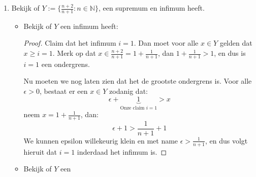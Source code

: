 \documentclass{article}
\newcommand{\f}[2]{\frac{#1}{#2}}
\newcommand{\tx}[1]{\text{#1}}
\newcommand{\N}{\mathbb{N}}
\begin{document}
\begin{enumerate}[label=\arabic*]
\begin{enumerate}[label=\alph*)]
\begin{enumerate}
\begin{itemize}
\begin{proof}
                                            Nu moeten we nog laten zien dat $s = 1$ de kleinste bovengrens is.
                                            Neem $x = 1 - \f{1}{n+2}$, dan moet gelden $\forall epsilon > 0$ dat:
                                            \[1 - \epsilon < x\]
                                            Waarbij $1$ de gesuggereerde bovengrens $s$ is.
                                            substitueer $x = 1 - \f{1}{n+2}$:
                                            \[1 - \epsilon < 1- \f{1}{n+2}\]
                                            Neem aan dat $\epsilon > \f{1}{n+2}$ dan is er altijd een
                                            $x$ waarvoor epsilon groter is als we $n$ groot genoeg maken.
                                            Hieruit volgt dus dat $s = 1$ de kleinste bovengrens moet zijn.
                                        \end{proof}
                              \end{itemize}
                        \item Bekijk of $Y:= \{\f{n+2}{n+1}: n \in \N\}$, een supremum en infimum heeft.
                              \begin{itemize}
                                  \item Bekijk of $Y$ een infimum heeft:
                                        \begin{proof}
                                            Claim dat het infimum $i = 1$.
                                            Dan moet voor alle $x \in Y$ gelden dat $x \geq i = 1$.
                                            Merk op dat $x \in \f{n+2}{n+1} = 1 + \f{1}{n+1}$, dan
                                            $1 + \f{1}{n+1} > 1$, en dus is $i=1$ een ondergrens.

                                            Nu moeten we nog laten zien dat het de grootste ondergrens is.
                                            Voor alle $\epsilon > 0$, bestaat er een $x \in Y$ zodanig dat:
                                            \[\epsilon + \underbrace{1}_{\tx{Onze claim } i = 1} > x \]
                                            neem $x = 1 + \f{1}{n+1}$, dan:
                                            \[\epsilon + 1 > \f{1}{n+1} + 1\]
                                            We kunnen epsilon willekeurig klein en met name $\epsilon > \f{1}{n+1}$,
                                            en dus volgt hieruit dat $i = 1$ inderdaad het infimum is.
                                        \end{proof}
                                  \item Bekijk of $Y$ een
                              \end{itemize}
                    \end{enumerate}
          \end{enumerate}
\end{enumerate}
\end{document}
